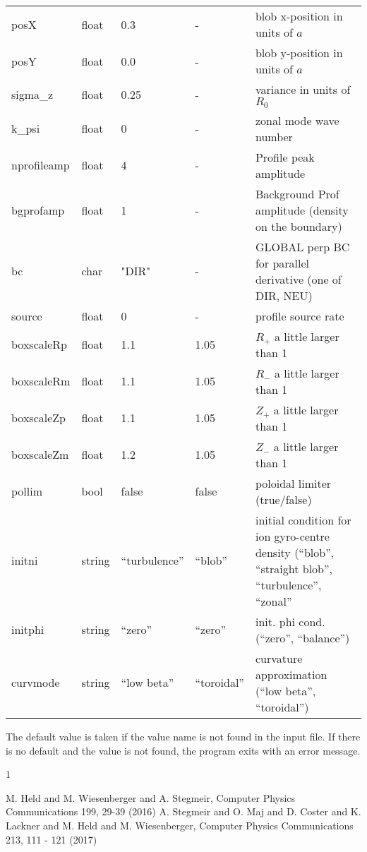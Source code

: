 \documentclass{hitec} %
\renewenvironment{thebibliography}[1]{
  \begin{oldthebibliography}{#1}
    \RaggedRight %
    \setlength{\itemsep}{0em}
    \setlength{\parskip}{0em}
}
{
  \end{oldthebibliography}
}
\begin{document}
\begin{longtable}{llll>{\RaggedRight}p{7cm}}
posX       & float &0.3    & - & blob x-position in units of $a$\\
posY       & float &0.0    & - & blob y-position in units of $a$ \\
sigma\_z    & float &0.25   & - & variance in units of $R_0$  \\
k\_psi     & float &0    & - & zonal mode wave number  \\
nprofileamp& float &4   & - & Profile peak amplitude \\
bgprofamp  & float &1   & - & Background Prof amplitude (density on the boundary) \\
bc  & char & "DIR"      & - & GLOBAL perp BC for parallel derivative (one of  DIR, NEU) \\
source  & float & 0     & - & profile source rate \\
boxscaleRp  & float & 1.1     & 1.05 & $R_+$ a little larger than 1\\
boxscaleRm  & float & 1.1     & 1.05 & $R_-$ a little larger than 1 \\
boxscaleZp  & float & 1.1     & 1.05 & $Z_+$ a little larger than 1 \\
boxscaleZm  & float & 1.2     & 1.05 & $Z_-$ a little larger than 1 \\
pollim    & bool & false     & false & poloidal limiter (true/false) \\
initni    & string & ``turbulence''     & ``blob''  & initial condition for ion gyro-centre density (``blob'', ``straight blob'',  ``turbulence'', ``zonal'' \\
initphi   & string & ``zero''  & ``zero'' & init. phi cond. (``zero'', ``balance'')\\
curvmode  & string & ``low beta''  & ``toroidal''& curvature approximation (``low beta'',  ``toroidal'') \\
\bottomrule
\end{longtable}
The default value is taken if the value name is not found in the input file. If there is no default and
the value is not found,
the program exits with an error message.
\begin{thebibliography}{1}
  M. Held and M. Wiesenberger and A. Stegmeir,  Computer Physics Communications 199, 29-39 (2016)
  A. Stegmeir and O. Maj and D. Coster and K. Lackner and M. Held and M. Wiesenberger, Computer Physics Communications 213, 111 - 121 (2017)
\end{thebibliography}
\end{document}
